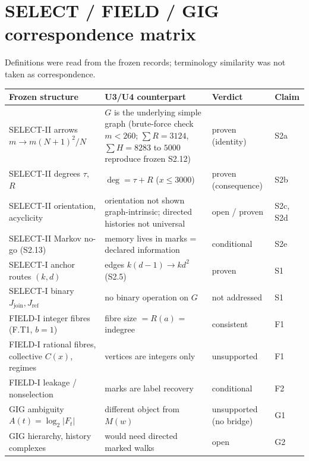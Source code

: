 \documentclass[11pt]{article}
\begin{document}
\section{SELECT / FIELD / GIG correspondence matrix}\label{sec:corr}
Definitions were read from the frozen records; terminology similarity was not taken as correspondence.
\begin{center}\small\begin{tabular}{@{}p{4.1cm}p{5.8cm}p{2.6cm}p{1.2cm}@{}}\toprule
Frozen structure & U3/U4 counterpart & Verdict & Claim\\\midrule
SELECT-II arrows $m\to m(N+1)^2/N$ & $G$ is the underlying simple graph (brute-force check $m<260$; $\sum R=3124$, $\sum H=8283$ to $5000$ reproduce frozen S2.12) & proven (identity) & S2a\\
SELECT-II degrees $\tau$, $R$ & $\deg=\tau+R$ ($x\le3000$) & proven (consequence) & S2b\\
SELECT-II orientation, acyclicity & orientation not shown graph-intrinsic; directed histories not universal & open / proven & S2c, S2d\\
SELECT-II Markov no-go (S2.13) & memory lives in marks = declared information & conditional & S2e\\
SELECT-I anchor routes $(k,d)$ & edges $k(d-1)\to kd^2$ (S2.5) & proven & S1\\
SELECT-I binary $J_{\mathrm{join}},J_{\mathrm{ref}}$ & no binary operation on $G$ & not addressed & S1\\
FIELD-I integer fibres (F.T1, $b=1$) & fibre size $=R(a)$ = indegree & consistent & F1\\
FIELD-I rational fibres, collective $C(x)$, regimes & vertices are integers only & unsupported & F1\\
FIELD-I leakage / nonselection & marks are label recovery & conditional & F2\\
GIG ambiguity $A(t)=\log_2|F_t|$ & different object from $M(w)$ & unsupported (no bridge) & G1\\
GIG hierarchy, history complexes & would need directed marked walks & open & G2\\
\bottomrule\end{tabular}\end{center}
\end{document}
